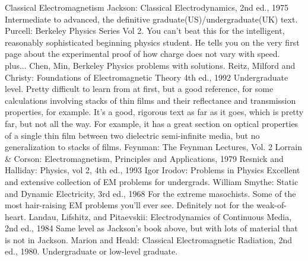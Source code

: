 \documentclass[10pt,a4paper]{book}
\theoremstyle{definition}
\begin{document}
Classical Electromagnetism
Jackson: Classical Electrodynamics, 2nd ed., 1975
Intermediate to advanced, the definitive graduate(US)/undergraduate(UK) text.
Purcell: Berkeley Physics Series Vol 2.
You can't beat this for the intelligent, reasonably sophisticated beginning physics student.  He tells you on the very first page about the experimental proof of how charge does not vary with speed.
plus... Chen, Min, Berkeley Physics problems with solutions.
Reitz, Milford and Christy: Foundations of Electromagnetic Theory 4th ed., 1992
Undergraduate level.  Pretty difficult to learn from at first, but a good reference, for some calculations involving stacks of thin films and their reflectance and transmission properties, for example.  It's a good, rigorous text as far as it goes, which is pretty far, but not all the way.  For example, it has a great section on optical properties of a single thin film between two dielectric semi-infinite media, but no generalization to stacks of films.
Feynman: The Feynman Lectures, Vol. 2
Lorrain \& Corson: Electromagnetism, Principles and Applications, 1979
Resnick and Halliday: Physics, vol 2, 4th ed., 1993
Igor Irodov: Problems in Physics Excellent and extensive collection of EM problems for undergrads.
William Smythe: Static and Dynamic Electricity, 3rd ed., 1968
For the extreme masochists.  Some of the most hair-raising EM problems you'll ever see.  Definitely not for the weak-of-heart.
Landau, Lifshitz, and Pitaevskii: Electrodynamics of Continuous Media, 2nd ed., 1984
Same level as Jackson's book above, but with lots of material that is not in Jackson.
Marion and Heald: Classical Electromagnetic Radiation, 2nd ed., 1980.
Undergraduate or low-level graduate.
\end{document}

